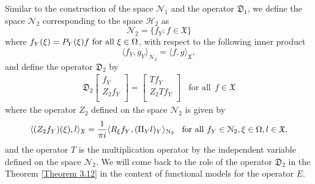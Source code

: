 \documentclass [12pt,reqno]{amsart}
\numberwithin{equation}{subsection}
\numberwithin{equation}{section}
\begin{document}
Similar to the construction of the space $\mathcal{N}_1$ and the operator $\mathfrak{D}_1$, we define the space $\mathcal{N}_2$ corresponding to the space $\mathcal{H}_2$ as 
\begin{equation} \label{Equation 3.30}
\mathcal{N}_2= \{f_Y : f \in \mathfrak{X} \}
\end{equation}
where \(f_Y(\xi) = P_Y(\xi)f$ for all $\xi \in \Omega\), with respect to the following inner product
\begin{equation} 
\langle f_Y, g_Y \rangle_{\mathcal{N}_2} = \langle f, g \rangle_{\mathfrak{X}},
\end{equation}
and define the operator $\mathfrak{D}_2$ by \begin{eqnarray} \label{Equation 3.32}
\mathfrak{D}_2\begin{bmatrix} 
                       	f_Y  \\
                    	Z_2f_Y \\
                    	\end{bmatrix}   = \begin{bmatrix} 
                       	                  Tf_Y  \\
                    	                  Z_2Tf_Y \\
                    	                   \end{bmatrix} ~~~~\mbox{for all}~~ f \in \mathfrak{X} 
\end{eqnarray} where the operator $Z_2$ defined on the space $\mathcal{N}_2$ is given by 
 \begin{equation}
 \langle (Z_2f_Y)(\xi), l \rangle_{\mathfrak{X}}= \frac{1}{\pi i}\langle R_{\xi}f_Y, (\Pi_Yl)_Y \rangle_{\mathcal{N}_2}
\hspace{0.3cm} \text{for all}~ f_Y \in \mathcal{N}_2, \xi \in \Omega, l \in \mathfrak{X},
\end{equation} 
and the operator $T$ is the multiplication operator by the independent variable defined on the space $\mathcal{N}_2$.
We will come back to the role of the operator $\mathfrak{D}_2$ in the Theorem \ref{Theorem 3.12} in the context of functional models for the operator $E$.
\end{document}
